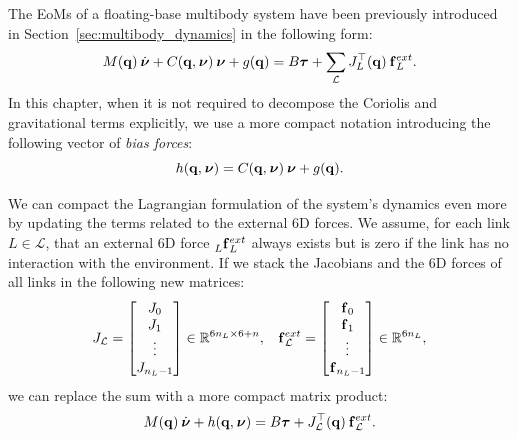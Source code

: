 The \acp{EoM} of a floating-base multibody system have been previously introduced in Section~\ref{sec:multibody_dynamics} in the following form:
%
\begin{equation*}
    M(\Qu) \Nud + C(\Qu, \Nu) \Nu + g(\Qu) = B \Torques + \sum_{\mathcal{L}} J_{L}^\top(\Qu) \forcesix_L^{ext}
    .
\end{equation*}
%
In this chapter, when it is not required to decompose the Coriolis and gravitational terms explicitly, we use a more compact notation introducing the following vector of \emph{bias forces}:
%
\begin{equation*}
    h(\Qu, \Nu) = C(\Qu, \Nu) \Nu + g(\Qu)
    .
\end{equation*}

We can compact the Lagrangian formulation of the system's dynamics even more by updating the terms related to the external 6D forces.
We assume, for each link $L \in \mathcal{L}$, that an external 6D force $\forcesix[L]^{ext}_L$ always exists but is zero if the link has no interaction with the environment.
If we stack the Jacobians and the 6D forces of all links in the following new matrices:
%
\begin{align*}
    J_\mathcal{L} = 
    \begin{bmatrix}
        J_0 \\
        J_1 \\
        \vdots \\
        J_{n_L - 1}
    \end{bmatrix} \in \mathbb{R}^{6 n_L \times 6+n},
    && 
    \forcesix^{ext}_\mathcal{L} = 
    \begin{bmatrix}
        \forcesix_0 \\
        \forcesix_1 \\
        \vdots \\
        \forcesix_{n_L - 1}
    \end{bmatrix} \in \mathbb{R}^{6 n_L}
    ,
\end{align*}
%
we can replace the sum with a more compact matrix product:
%
\begin{equation}
    \label{eq:eom_multibody_compact}
    M(\Qu) \Nud + h(\Qu, \Nu) = B \Torques + J_\mathcal{L}^\top(\Qu) \forcesix^{ext}_\mathcal{L}
    .
\end{equation}

